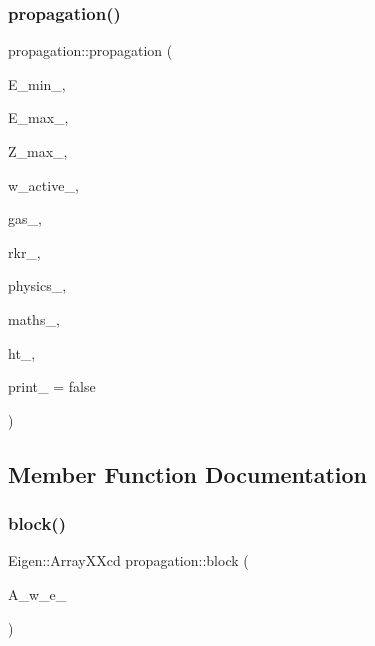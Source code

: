 \subsubsection{\texorpdfstring{propagation()}{propagation()}\hspace{0.1cm}{\footnotesize\ttfamily [2/2]}}
{\footnotesize\ttfamily propagation\+::propagation (\begin{DoxyParamCaption}\item[{double}]{E\+\_\+min\+\_\+,  }\item[{double}]{E\+\_\+max\+\_\+,  }\item[{double}]{Z\+\_\+max\+\_\+,  }\item[{Eigen\+::\+Array\+Xd}]{w\+\_\+active\+\_\+,  }\item[{\mbox{\hyperlink{classkeldysh__gas}{keldysh\+\_\+gas}} \&}]{gas\+\_\+,  }\item[{\mbox{\hyperlink{classgrid__rkr}{grid\+\_\+rkr}} \&}]{rkr\+\_\+,  }\item[{\mbox{\hyperlink{classphysics__textbook}{physics\+\_\+textbook}} \&}]{physics\+\_\+,  }\item[{\mbox{\hyperlink{classmaths__textbook}{maths\+\_\+textbook}} \&}]{maths\+\_\+,  }\item[{\mbox{\hyperlink{class_d_h_t}{D\+HT}} \&}]{ht\+\_\+,  }\item[{bool}]{print\+\_\+ = {\ttfamily false} }\end{DoxyParamCaption})}



\subsection{Member Function Documentation}
\mbox{\label{classpropagation_af12b15d9b91f98516c0ff25efc1233d1}} 
\subsubsection{\texorpdfstring{block()}{block()}}
{\footnotesize\ttfamily Eigen\+::\+Array\+X\+Xcd propagation\+::block (\begin{DoxyParamCaption}\item[{Eigen\+::\+Array\+X\+Xcd}]{A\+\_\+w\+\_\+e\+\_\+ }\end{DoxyParamCaption})}

\mbox{\label{classpropagation_a9c2e1cb4e314c173b26de08ffcfe071d}} 
